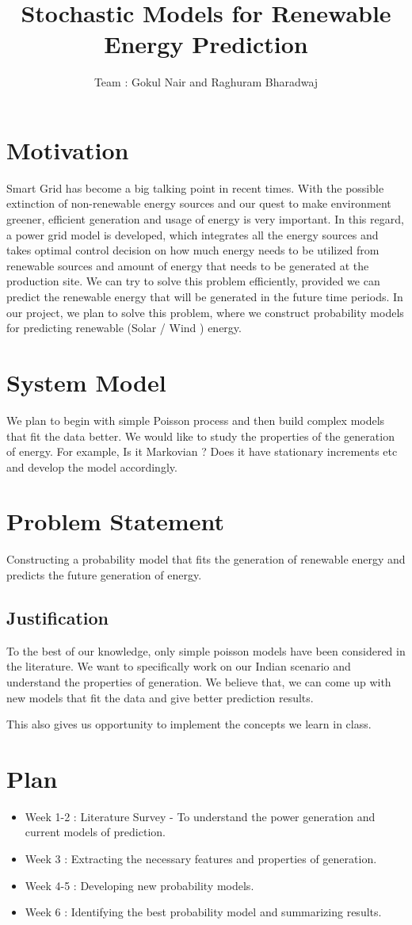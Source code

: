 \documentclass[a4paper,english,12pt]{article}
\title{Stochastic Models for Renewable Energy Prediction}
\author{Team : Gokul Nair and Raghuram Bharadwaj}
\begin{document}
\maketitle

\section{Motivation}
Smart Grid has become a big talking point in recent times. With the possible extinction of non-renewable energy sources and our quest to make environment greener, efficient generation and usage of energy is very important. In this regard, a power grid model is developed, which integrates all the energy sources and takes optimal control decision on how much energy needs to be utilized from renewable sources and amount of energy that needs to be generated at the production site. We can try to solve this problem efficiently, provided we can predict the renewable energy that will be generated in the future time periods. In our project, we plan to solve this problem, where we construct probability models for predicting renewable (Solar / Wind ) energy.  
 \section{System Model}
We plan to begin with simple Poisson process and then build complex models that fit the data better. We would like to study the properties of the generation of energy. For example, Is it Markovian ? Does it have stationary increments etc and develop the model accordingly.   
\section{Problem Statement}
Constructing a probability model that fits the generation of renewable energy and predicts the future generation of energy. 
\subsection{Justification}
To the best of our knowledge, only simple poisson models have been considered in the literature. We want to specifically work on our Indian scenario and understand the properties of generation. We believe that, we can come up with new models that fit the data and give better prediction results.

This also gives us opportunity to implement the concepts we learn in class. 

\section{Plan}

\begin{itemize}
	\item Week 1-2 :  Literature Survey - To understand the power generation and current models of prediction. 
	\item Week 3   :  Extracting the necessary features and properties of generation. 
	\item Week 4-5 :  Developing new probability models.
	\item Week 6   :  Identifying the best probability model and summarizing results.  
\end{itemize}
\end{document}
